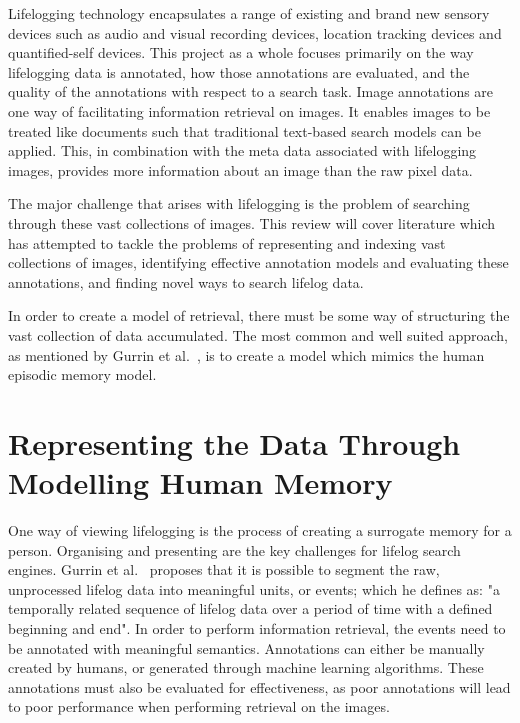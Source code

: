 \documentclass[12pt,a4paper]{article}
\begin{document}
Lifelogging technology encapsulates a range of existing and brand new sensory devices such as audio and visual recording devices, location tracking devices and quantified-self devices. This project as a whole focuses primarily on the way lifelogging data is annotated, how those annotations are evaluated, and the quality of the annotations with respect to a search task. Image annotations are one way of facilitating information retrieval on images. It enables images to be treated like documents such that traditional text-based search models can be applied. This, in combination with the meta data associated with lifelogging images, provides more information about an image than the raw pixel data.

The major challenge that arises with lifelogging is the problem of searching through these vast collections of images. This review will cover literature which has attempted to tackle the problems of representing and indexing vast collections of images, identifying effective annotation models and evaluating these annotations, and finding novel ways to search lifelog data.

In order to create a model of retrieval, there must be some way of structuring the vast collection of data accumulated. The most common and well suited approach, as mentioned by Gurrin et al.~\cite{gurrin2014lifelogging}, is to create a model which mimics the human episodic memory model.

\section{Representing the Data Through Modelling Human Memory}

One way of viewing lifelogging is the process of creating a surrogate memory for a person. Organising and presenting are the key challenges for lifelog search engines. Gurrin et al.~\cite{gurrin2014lifelogging} proposes that it is possible to segment the raw, unprocessed lifelog data into meaningful units, or events; which he defines as: "a temporally related sequence of lifelog data over a period of time with a defined beginning and end". In order to perform information retrieval, the events need to be annotated with meaningful semantics. Annotations can either be manually created by humans, or generated through machine learning algorithms. These annotations must also be evaluated for effectiveness, as poor annotations will lead to poor performance when performing retrieval on the images.
\end{document}
